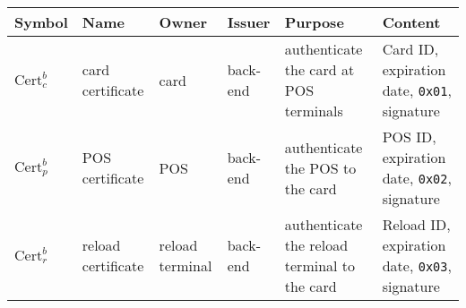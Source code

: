 \begin{tabular}{|l|p{1.7cm}|p{1.5cm}|p{1.5cm}|p{4cm}|p{3cm}|}
\hline
    Symbol & Name & Owner & Issuer & Purpose & Content \\
\hline
    $\textrm{Cert}_c^b$ & card certificate & card & back-end & authenticate the card at POS terminals & Card ID, expiration date, \texttt{0x01}, signature \\
\hline
    $\textrm{Cert}_p^b$ & POS certificate & POS & back-end & authenticate the POS to the card & POS ID, expiration date, \texttt{0x02}, signature \\
\hline
    $\textrm{Cert}_r^b$ & reload certificate & reload terminal & back-end & authenticate the reload terminal to the card & Reload ID, expiration date, \texttt{0x03}, signature \\
\hline
\end{tabular}